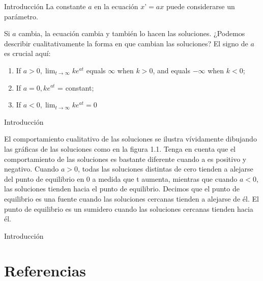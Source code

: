 \documentclass[11pt]{beamer}
\begin{document}
\begin{frame}{Introducción}
			\justifying
	La constante $a$ en la ecuación $x’ = ax$ puede considerarse un parámetro.

Si $a$ cambia, la ecuación cambia y también lo hacen las soluciones. ¿Podemos describir cualitativamente la forma en que cambian las soluciones? El signo de $a$ es crucial aquí:

\begin{enumerate}
\item If $a > 0, \lim_{t \to \infty} k e^{at}$ equals $\infty$ when $k > 0$, and equals $- \infty$ when $k < 0$;

\item If $a = 0, ke^{at}$ = constant;

\item If $a < 0, \lim_{t \to \infty} k e^{at}=0$

\end{enumerate}		
\end{frame}

\begin{frame}{Introducción}
			\justifying
			
El comportamiento cualitativo de las soluciones se ilustra vívidamente dibujando las gráficas de las soluciones como en la figura 1.1. Tenga en cuenta que el comportamiento de las soluciones es bastante diferente cuando a es positivo y negativo. Cuando $a > 0$, todas las soluciones distintas de cero tienden a alejarse del punto de equilibrio en 0 a medida que t aumenta, mientras que cuando $a < 0$, las soluciones tienden hacia el punto de equilibrio. Decimos que el punto de equilibrio es una fuente cuando las soluciones cercanas tienden a alejarse de él. El punto de equilibrio es un sumidero cuando las soluciones cercanas tienden hacia él.

			
\end{frame}

\begin{frame}{Introducción}
			\justifying
			
\end{frame}




			
\section{Referencias}
\end{document}
